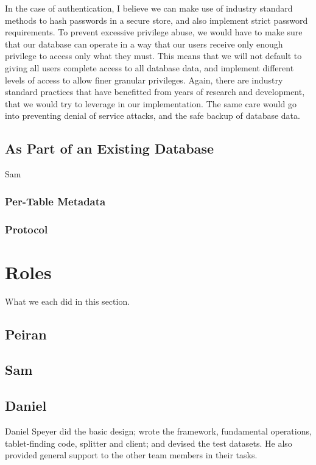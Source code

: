 \documentclass[11pt]{article}
\begin{document}
In the case of authentication, I believe we can make use of industry standard methods to hash passwords in a secure store, and also implement strict password requirements. To prevent excessive privilege abuse, we would have to make sure that our database can operate in a way that our users receive only enough privilege to access only what they must. This means that we will not default to giving all users complete access to all database data, and implement different levels of access to allow finer granular privileges. Again, there are industry standard practices that have benefitted from years of research and development, that we would try to leverage in our implementation. The same care would go into preventing denial of service attacks, and the safe backup of database data.

\subsection{As Part of an Existing Database}
Sam
\subsubsection{Per-Table Metadata}

\subsubsection{Protocol}

\section{Roles}
What we each did in this section.
\subsection{Peiran}

\subsection{Sam}

\subsection{Daniel}

Daniel Speyer did the basic design; wrote the framework, fundamental operations, tablet-finding code, splitter and client; and devised the test datasets.  He also provided general support to the other team members in their tasks.
\end{document}
